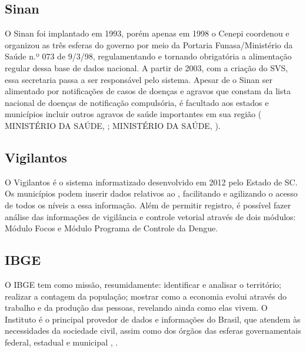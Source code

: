 \subsection{\acrfull{Sinan}}

O \acrfull{Sinan} foi implantado em 1993, porém apenas em 1998 o \acrfull{Cenepi} coordenou e organizou as três esferas do governo por meio da Portaria \acrshort{Funasa}/Ministério da Saúde n.º 073 de 9/3/98,  regulamentando  e tornando obrigatória a alimentação regular dessa base de dados nacional. A partir de 2003, com a criação do \acrfull{SVS}, essa secretaria passa a ser responsável pelo sistema. Apesar de o \acrshort{Sinan} ser alimentado por notificações  de casos de doenças e agravos que constam da lista nacional de doenças de notificação compulsória, é facultado aos estados e municípios incluir outros agravos de saúde importantes em sua região ( MINISTÉRIO DA SAÚDE, \citeyear{SINANWEB}; MINISTÉRIO DA SAÚDE, \citeyear{SINAN07Ministerio}).

\subsection{Vigilantos}
O Vigilantos é o sistema informatizado  desenvolvido em 2012 pelo Estado de \acrlong{SC}. Os municípios podem inserir dados relativos ao , facilitando e agilizando o acesso de todos os níveis a essa informação. Além de permitir registro, é possível fazer análise das informações de vigilância e controle vetorial através de dois módulos: Módulo Focos e Módulo Programa de Controle da Dengue. \cite{Vigilantos}

\subsection{\acrfull{IBGE}}

O \acrshort{IBGE} tem como missão, resumidamente: identificar e analisar o território; realizar a contagem da população; mostrar como a economia evolui através do trabalho e da produção das pessoas, revelando ainda como elas vivem.  O Instituto é o principal provedor de dados e informações do Brasil, que atendem às necessidades da sociedade civil, assim como dos órgãos das esferas governamentais federal, estadual e municipal \cite{IBGE22}, \cite{IBGE23prev}.


